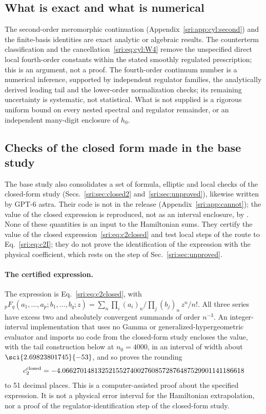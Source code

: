 \subsection{What is exact and what is numerical}\label{sri:app:cyl:status}
The second-order meromorphic continuation (Appendix~\ref{sri:app:cyl:second}) and the finite-basis identities are exact
analytic or algebraic results. The counterterm classification and the cancellation~\eqref{sri:eq:cyl:W4} remove the
unspecified direct local fourth-order constants within the stated smoothly regulated prescription; this is an
argument, not a proof. The fourth-order continuum number is a numerical inference, supported by independent regulator
families, the analytically derived leading tail and the lower-order normalization checks; its remaining uncertainty is
systematic, not statistical. What is not supplied is a rigorous
uniform bound on every nested spectral and regulator remainder, or an independent many-digit enclosure of $h_0$.

\subsection{Checks of the closed form made in the base study}\label{sri:app:cyl:closedchecks}
The base study also consolidates a set of formula, elliptic and local checks of the closed-form study
(Secs.~\ref{sri:sec:closed2} and~\ref{sri:sec:unproved}), likewise written by GPT-6 astra. Their code is not in the release
(Appendix~\ref{sri:app:cannot}); the value of the closed expression is reproduced, not as an interval enclosure, by
. None of these quantities is an input
to the Hamiltonian sums. They certify the value of the closed expression~\eqref{sri:eq:c2closed} and test local steps of
the route to Eq.~\eqref{sri:eq:c2I}; they do not prove the identification of the expression with the physical coefficient,
which rests on the step of Sec.~\ref{sri:sec:unproved}.

\paragraph{The certified expression.} The expression is Eq.~\eqref{sri:eq:c2closed}, with
${}_pF_q(a_1,\ldots,a_p;b_1,\ldots,b_q;z)=\sum_n\prod_i(a_i)_n/\prod_j(b_j)_n\,z^n/n!$. All three series have excess
two and absolutely convergent summands of order $n^{-3}$. An integer-interval implementation that uses no Gamma or
generalized-hypergeometric evaluator and imports no code from the closed-form study encloses the value, with the tail
construction below at $n_0=4000$, in an interval of width about $\sci{2.69823801745}{-53}$, and so proves the rounding
\begin{equation}
 c_2^{\rm closed}=-4.066270148132521552740027608572876487529901141186618
 \label{sri:eq:cyl:certified}
\end{equation}
to 51 decimal places. This is a computer-assisted proof about the specified expression. It is not a physical error
interval for the Hamiltonian extrapolation, nor a proof of the regulator-identification step of the closed-form study.

